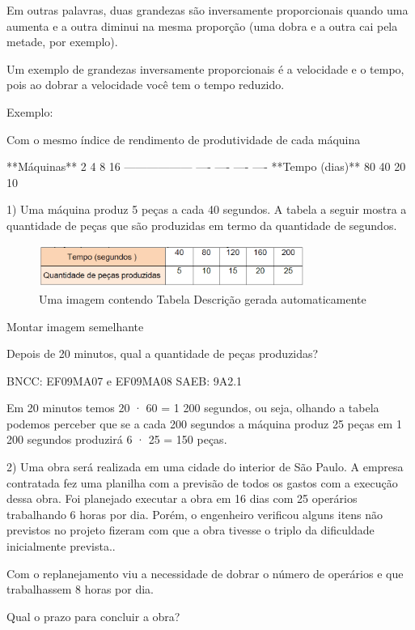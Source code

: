 \begin{escolha}
{{{\begin{escolha}
{{Em outras palavras, duas grandezas são inversamente proporcionais quando
uma aumenta e a outra diminui na mesma proporção (uma dobra e a outra
cai pela metade, por exemplo).

Um exemplo de grandezas inversamente proporcionais é a velocidade e o
tempo, pois ao dobrar a velocidade você tem o tempo reduzido.

Exemplo:

Com o mesmo índice de rendimento de produtividade de cada máquina

  **Máquinas**       2    4    8    16
  ------------------ ---- ---- ---- ----
  **Tempo (dias)**   80   40   20   10
}


1) Uma máquina produz 5 peças a cada 40 segundos. A tabela a seguir
mostra a quantidade de peças que são produzidas em termo da quantidade
de segundos.

\begin{figure}
\centering
\includegraphics[width=3.41667in,height=0.55in]{./_SAEB_9_MAT/media/image132.png}
\caption{Uma imagem contendo Tabela Descrição gerada automaticamente}
\end{figure}

Montar imagem semelhante

Depois de 20 minutos, qual a quantidade de peças produzidas?

BNCC: EF09MA07 e EF09MA08 SAEB: 9A2.1

Em 20 minutos temos 20 · 60 = 1 200 segundos, ou seja, olhando a tabela
podemos perceber que se a cada 200 segundos a máquina produz 25 peças em
1 200 segundos produzirá 6 · 25 = 150 peças.

2) Uma obra será realizada em uma cidade do interior de São Paulo. A
empresa contratada fez uma planilha com a previsão de todos os gastos
com a execução dessa obra. Foi planejado executar a obra em 16 dias com
25 operários trabalhando 6 horas por dia. Porém, o engenheiro verificou
alguns itens não previstos no projeto fizeram com que a obra tivesse o
triplo da dificuldade inicialmente prevista..

Com o replanejamento viu a necessidade de dobrar o número de operários e
que trabalhassem 8 horas por dia.

Qual o prazo para concluir a obra?

}
\end{escolha}}}}
\end{escolha}
